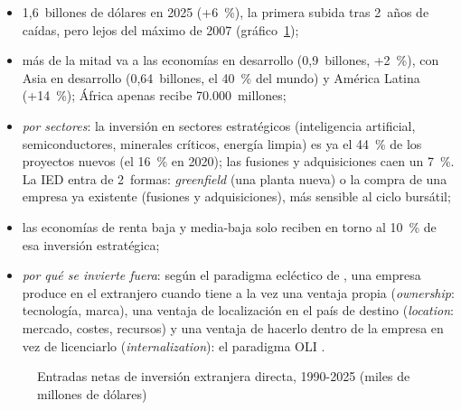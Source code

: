 \documentclass[11pt]{article}
\begin{document}
\begin{itemize}
\begin{itemize}
  \item 1,6~billones de dólares en 2025 (+6~\%), la primera subida tras 2~años de caídas, pero lejos del máximo de 2007 (gráfico~\ref{fig:ied})\nocite{UNCTAD2026WIR};
  \item más de la mitad va a las economías en desarrollo (0,9~billones, +2~\%), con Asia en desarrollo (0,64~billones, el 40~\% del mundo) y América Latina (+14~\%); África apenas recibe 70.000~millones\nocite{UNCTAD2026WIR};
  \item \emph{por sectores}: la inversión en sectores estratégicos (inteligencia artificial, semiconductores, minerales críticos, energía limpia) es ya el 44~\% de los proyectos nuevos (el 16~\% en 2020); las fusiones y adquisiciones caen un 7~\%\nocite{UNCTAD2026WIR}. La IED entra de 2~formas: \emph{greenfield} (una planta nueva) o la compra de una empresa ya existente (fusiones y adquisiciones), más sensible al ciclo bursátil;
  \item las economías de renta baja y media-baja solo reciben en torno al 10~\% de esa inversión estratégica;
  \item \emph{por qué se invierte fuera}: según el paradigma ecléctico de \textcite{Dunning1980Eclectic}, una empresa produce en el extranjero cuando tiene a la vez una ventaja propia (\emph{ownership}: tecnología, marca), una ventaja de localización en el país de destino (\emph{location}: mercado, costes, recursos) y una ventaja de hacerlo dentro de la empresa en vez de licenciarlo (\emph{internalization}): el paradigma OLI .
  \end{itemize}
\end{itemize}

\begin{figure}[H]
\centering
\caption{Entradas netas de inversión extranjera directa, 1990-2025 (miles de millones de dólares)}\label{fig:ied}
\end{figure}
\end{document}
